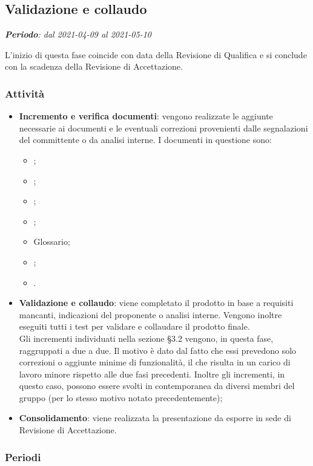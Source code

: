 \subsection{Validazione e collaudo}
\textit{\textbf{Periodo}: dal 2021-04-09 al 2021-05-10}

L'inizio di questa fase coincide con data della Revisione di Qualifica e si conclude con la scadenza della Revisione di Accettazione.

\subsubsection{Attività}

\begin{itemize}
\item \textbf{Incremento e verifica documenti}: vengono realizzate le aggiunte necessarie ai documenti e le eventuali correzioni provenienti dalle segnalazioni del committente o da analisi interne. I documenti in questione sono:
\begin{itemize}
\item \NdP{};
\item \AdR{};
\item \PdQ{};
\item \PdP{};
\item Glossario;
\item \MU{};
\item \MM{}.
\end{itemize}
\item \textbf{Validazione e collaudo}: viene completato il prodotto in base a requisiti mancanti, indicazioni del proponente o analisi interne. Vengono inoltre eseguiti tutti i test per validare e collaudare il prodotto finale.\\ Gli incrementi individuati nella sezione \S{3.2} vengono, in questa fase, raggruppati a due a due. Il motivo è dato dal fatto che essi prevedono solo correzioni o aggiunte minime di funzionalità, il che risulta in un carico di lavoro minore rispetto alle due fasi precedenti. Inoltre gli incrementi, in questo caso, possono essere svolti in contemporanea da diversi membri del gruppo (per lo stesso motivo notato precedentemente);
\item \textbf{Consolidamento}: viene realizzata la presentazione da esporre in sede di Revisione di Accettazione.
\end{itemize}

\subsubsection{Periodi}

